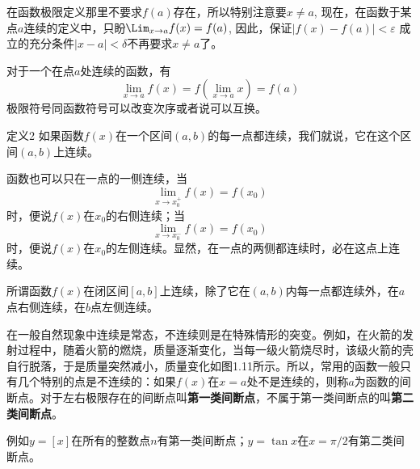 \begin{rmk}
在函数极限定义那里不要求$f(a)$存在，所以特别注意要$x\ne a$, 现在，在函数于某点$a$连续的定义中，只盼$\Lim_{x\to a} f(x)=f(a)$, 因此，保证$|f(x)-f(a)|<\varepsilon$
成立的充分条件$|x-a|<\delta$不再要求$x\ne a$了。
\end{rmk}

对于一个在点$a$处连续的函数，有
\[\lim_{x\to a}f (x) =f \left(\lim_{x\to a} x\right) =f (a)\]  
极限符号同函数符号可以改变次序或者说可以互换。

\begin{blk}
 {定义2 }如果函数$f(x)$在一个区间$(a,b)$的每一点都连续，我们就说，它在这个区间$(a,b)$上连续。   
\end{blk}

函数也可以只在一点的一侧连续，当
\[\lim_{x\to x_0^+} f (x) =f (x_0)\]
时，便说$f(x)$在$x_0$的右侧连续；当
\[\lim_{x\to x_0^-} f (x) =f (x_0)\]
时，便说$f(x)$在$x_0$的左侧连续。显然，在一点的两侧都连续时，必在这点上连续。

所谓函数$f(x)$在闭区间$[a,b]$上连续，除了它在$(a,b)$内每一点都连续外，在$a$点右侧连续，在$b$点左侧连续。

在一般自然现象中连续是常态，不连续则是在特殊情形的突变。例如，在火箭的发射过程中，随着火箭的燃烧，质量逐渐变化，当每一级火箭烧尽时，该级火箭的壳自行脱落，于是质量突然减小，质量变化如图1.11所示。所以，常用的函数一般只有几个特别的点是不连续的：如果$f(x)$在$x=a$处不是连续的，则称$a$为函数的间断点。对于左右极限存在的间断点叫\textbf{第一类间断点}，不属于第一类间断点的叫\textbf{第二类间断点}。

例如$y=[x]$在所有的整数点$n$有第一类间断点；$y=\tan x$在$x=\pi/2$有第二类间断点。

\begin{figure}[htp]
    \centering
    \begin{minipage}[t]{0.48\textwidth}
    \centering
    \caption{}
    \end{minipage}
    \begin{minipage}[t]{0.48\textwidth}
    \centering
    \caption{}
    \end{minipage}
    \end{figure}

